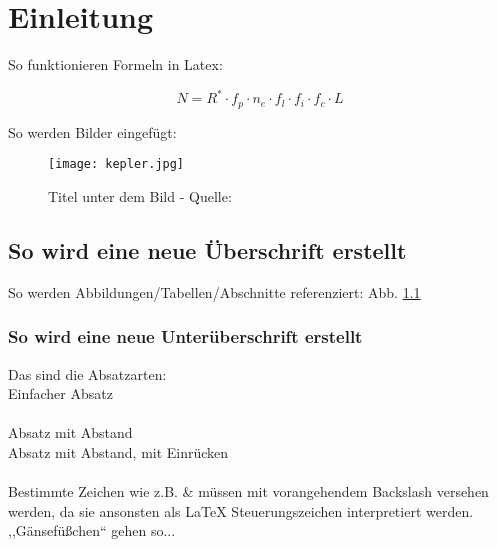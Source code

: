 \chapter{Einleitung}

So funktionieren Formeln in Latex:
\begin{center}
	\begin{equation}
		N = R^{*} \cdot f_{p} \cdot n_{e} \cdot f_{l} \cdot f_{i} \cdot f_{c} \cdot L 
	\end{equation}
\end{center}

\noindent So werden Bilder eingefügt:\\

\begin{figure}[h] %
	\centering
	\label{figure:kepler}
	\texttt{[image: kepler.jpg]} %
	\caption[Kepler (Titel im Abk.-Verzeichnis)]{Titel unter dem Bild - Quelle: \cite{key}}
\end{figure}

\section{So wird eine neue Überschrift erstellt}
So werden Abbildungen/Tabellen/Abschnitte referenziert: Abb. \ref{figure:kepler}\\

\subsection{So wird eine neue Unterüberschrift erstellt}
Das sind die Absatzarten:\\
Einfacher Absatz\\\\
Absatz mit Abstand\\

Absatz mit Abstand, mit Einrücken\\\\

\noindent Bestimmte Zeichen wie z.B. \& müssen mit vorangehendem Backslash versehen werden, da sie ansonsten als LaTeX Steuerungszeichen interpretiert werden. ,,Gänsefüßchen`` gehen so...


